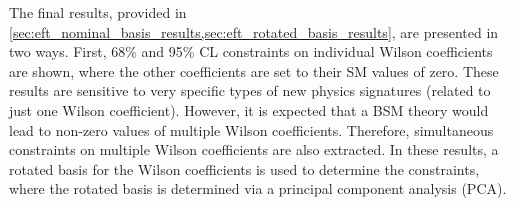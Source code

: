 The final results, provided in \cref{sec:eft_nominal_basis_results,sec:eft_rotated_basis_results}, are presented in two ways. First, 68\% and 95\% CL constraints on individual Wilson coefficients are shown, where the other coefficients are set to their SM values of zero. These results are sensitive to very specific types of new physics signatures (related to just one Wilson coefficient). However, it is expected that a BSM theory would lead to non-zero values of multiple Wilson coefficients. Therefore, simultaneous constraints on multiple Wilson coefficients are also extracted. In these results, a rotated basis for the Wilson coefficients is used to determine the constraints, where the rotated basis is determined via a principal component analysis (PCA). 
